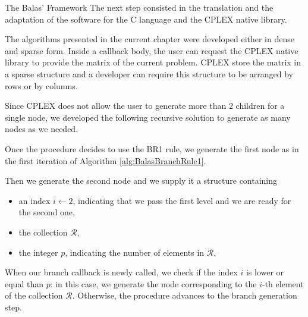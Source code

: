 \documentclass[a4paper,12pt]{mydeitesi_eng}
\begin{document}
\begin{chapter}{The Balas' Framework}
The next step consisted in the translation and the adaptation of the software for the C language and the CPLEX native library.

The algorithms presented in the current chapter were developed either in dense and sparse form.
Inside a callback body, the user can request the CPLEX native library to provide the matrix of the current problem.
CPLEX store the matrix in a sparse structure and a developer can require this structure to be arranged by rows or by columns.



Since CPLEX does not allow the user to generate more than $2$ children for a single node, we developed the following recursive solution to generate as many nodes as we needed.

Once the procedure decides to use the BR1 rule, we generate the first node as in the first iteration of Algorithm \ref{alg:BalasBranchRule1}.

Then we generate the second node and we supply it a structure containing
\begin{itemize}
\item an index $i\gets 2$, indicating that we pass the first level and we are ready for the second one,
\item the collection $\mathcal{R}$,
\item the integer $p$, indicating the number of elements in $\mathcal{R}$.
\end{itemize}
When our branch callback is newly called, we check if the index $i$ is lower or equal than $p$: in this case, we generate the node corresponding to the $i$-th element of the collection $\mathcal{R}$.
Otherwise, the procedure advances to the branch generation step.\\

\end{chapter}


\newpage
\thispagestyle{empty}
\mbox{}
\end{document}
